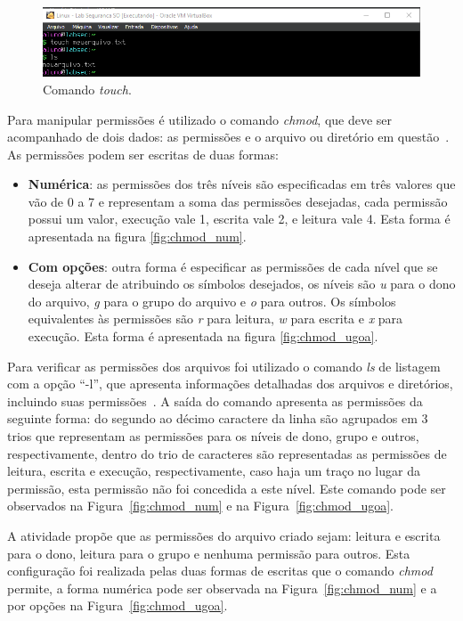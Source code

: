 \documentclass[
    12pt,				%
    oneside,   	        %
    a4paper,			%
    english,			%
    french,				%
    spanish,			%
    brazil,				%
    ]{pacotes/abntex2}
\begin{document}
\begin{figure}[H]
  \centering
  \includegraphics[scale=0.7]{figuras/touch.png}
  \caption{Comando \textit{touch}.}
  \label{fig:touch}
\end{figure}

Para manipular permissões é utilizado o comando \textit{chmod}, que deve ser acompanhado de dois dados: as permissões e o arquivo ou diretório em questão~\cite{negus2012}. As permissões podem ser escritas de duas formas:

\begin{itemize}
    \item \textbf{Numérica}: as permissões dos três níveis são especificadas em três valores que vão de 0 a 7 e representam a soma das permissões desejadas, cada permissão possui um valor, execução vale 1, escrita vale 2, e leitura vale 4. Esta forma é apresentada na figura \ref{fig:chmod_num}.
    \item \textbf{Com opções}: outra forma é especificar as permissões de cada nível que se deseja alterar de atribuindo os símbolos desejados, os níveis são \textit{u} para o dono do arquivo, \textit{g} para o grupo do arquivo e \textit{o} para outros. Os símbolos equivalentes às permissões são \textit{r} para leitura, \textit{w} para escrita e \textit{x} para execução. Esta forma é apresentada na figura \ref{fig:chmod_ugoa}.
\end{itemize}

Para verificar as permissões dos arquivos foi utilizado o comando \textit{ls} de listagem com a opção ``-l'', que apresenta informações detalhadas dos arquivos e diretórios, incluindo suas permissões~\cite{negus2012}. A saída do comando apresenta as permissões da seguinte forma: do segundo ao décimo caractere da linha são agrupados em 3 trios que representam as permissões para os níveis de dono, grupo e outros, respectivamente, dentro do trio de caracteres são representadas as permissões de leitura, escrita e execução, respectivamente, caso haja um traço no lugar da permissão, esta permissão não foi concedida a este nível. Este comando pode ser observados na Figura~\ref{fig:chmod_num} e na Figura~\ref{fig:chmod_ugoa}.

A atividade propõe que as permissões do arquivo criado sejam: leitura e escrita para o dono, leitura para o grupo e nenhuma permissão para outros. Esta configuração foi realizada pelas duas formas de escritas que o comando \textit{chmod} permite, a forma numérica pode ser observada na Figura~\ref{fig:chmod_num} e a por opções na Figura~\ref{fig:chmod_ugoa}.
\end{document}
